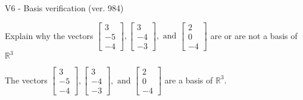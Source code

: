 \begin{exercise}
  \begin{exerciseTitle}V6 - Basis verification (ver. 984)\end{exerciseTitle}
  \begin{exerciseStatement}
    Explain why the vectors \(\left[\begin{array}{r}
3 \\
-5 \\
-4
\end{array}\right] , \left[\begin{array}{r}
3 \\
-4 \\
-3
\end{array}\right] , \text{ and } \left[\begin{array}{r}
2 \\
0 \\
-4
\end{array}\right]\) are or are not a basis of \(\mathbb{R}^3\)	


  \end{exerciseStatement}
  \begin{exerciseAnswer}
   The vectors \(\left[\begin{array}{r}
3 \\
-5 \\
-4
\end{array}\right] , \left[\begin{array}{r}
3 \\
-4 \\
-3
\end{array}\right] , \text{ and } \left[\begin{array}{r}
2 \\
0 \\
-4
\end{array}\right]\) 
  	 are  a basis of \(\mathbb{R}^3\).
  


  \end{exerciseAnswer}
\end{exercise}